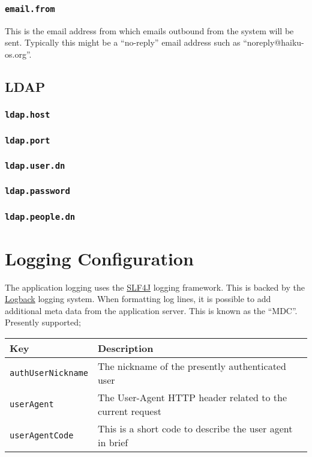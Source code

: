 \subsubsection{\tt email.from}

This is the email address from which emails outbound from the system will be sent.  Typically this might be a ``no-reply'' email address such as ``noreply@haiku-os.org''.

\subsection{LDAP}


\subsubsection{\tt ldap.host}
\subsubsection{\tt ldap.port}
\subsubsection{\tt ldap.user.dn}
\subsubsection{\tt ldap.password}
\subsubsection{\tt ldap.people.dn}

\section{Logging Configuration}

The application logging uses the \href{http://www.slf4j.org/}{SLF4J} logging framework.  This is backed by the \href{http://logback.qos.ch/}{Logback} logging system.  When formatting log lines, it is possible to add additional meta data from the application server.  This is known as the ``MDC''.  Presently supported;

\begin{tabular}{ | l | l | }
\hline
Key & Description \\
\hline
{\tt authUserNickname} & The nickname of the presently authenticated user \\
{\tt userAgent} & The User-Agent HTTP header related to the current request \\
{\tt userAgentCode} & This is a short code to describe the user agent in brief \\
\hline
\end{tabular}